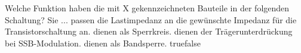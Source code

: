     {Welche Funktion haben die mit X gekennzeichneten Bauteile in der folgenden Schaltung? Sie  ...}
    {passen die Lastimpedanz an die gewünschte Impedanz für die Transistorschaltung an.}
    {dienen als Sperrkreis. }
    {dienen der Trägerunterdrückung bei SSB-Modulation. }
    {dienen als Bandsperre. }
    {true}{false}